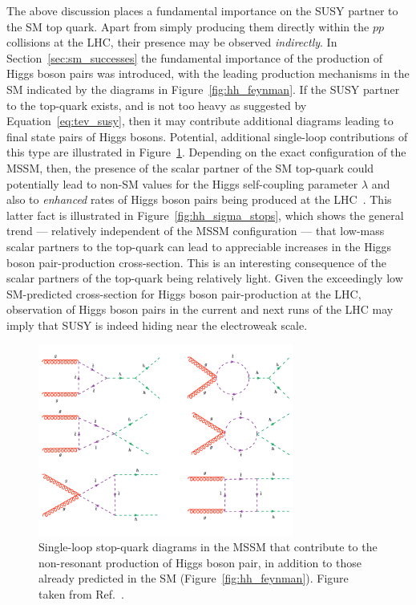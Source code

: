 The above discussion places a fundamental importance on the SUSY partner to the SM top quark.
Apart from simply producing them directly within the $pp$ collisions at the LHC,
their presence may be observed \textit{indirectly}.
In Section~\ref{sec:sm_successes} the fundamental importance of the production of Higgs boson
pairs was introduced, with the leading production mechanisms in the SM indicated
by the diagrams in Figure~\ref{fig:hh_feynman}.
If the SUSY partner to the top-quark exists, and is not too heavy as suggested by Equation~\ref{eq:tev_susy},
then it may contribute additional diagrams leading to final state
pairs of Higgs bosons.
Potential, additional single-loop contributions of this type are illustrated
in Figure~\ref{fig:hh_stops}.
Depending on the exact configuration of the MSSM, then, the presence of the scalar partner
of the SM top-quark could potentially lead to non-SM values for the Higgs self-coupling parameter $\lambda$ and
also to \textit{enhanced} rates of Higgs boson pairs
being produced at the LHC~\cite{LightStopsHiggs}.
This latter fact is illustrated in Figure~\ref{fig:hh_sigma_stops}, which shows the general
trend --- relatively independent of the MSSM configuration --- that low-mass scalar partners to the top-quark
can lead to appreciable increases in the Higgs boson pair-production cross-section.
This is an interesting consequence of the scalar partners of the top-quark being relatively
light.
Given the exceedingly low SM-predicted cross-section for Higgs boson pair-production at the LHC,
observation of Higgs boson pairs in the current and next runs of the LHC may imply that SUSY
is indeed hiding near the electroweak scale.

\begin{figure}[!htb]
    \begin{center}
        \includegraphics[width=0.75\textwidth]{figures/higgs_corr/hh_stopsPDF}
        \caption{
            Single-loop stop-quark diagrams in the MSSM that contribute to the non-resonant production
            of Higgs boson pair, in addition to those already predicted in the SM (Figure~\ref{fig:hh_feynman}). Figure taken from Ref.~\cite{LightStopsHiggs}.
        }
        \label{fig:hh_stops}
    \end{center}
\end{figure}

